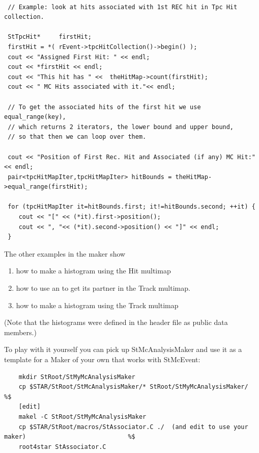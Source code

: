 \begin{verbatim}

 // Example: look at hits associated with 1st REC hit in Tpc Hit collection.

 StTpcHit*     firstHit;
 firstHit = *( rEvent->tpcHitCollection()->begin() );
 cout << "Assigned First Hit: " << endl;
 cout << *firstHit << endl;
 cout << "This hit has " <<  theHitMap->count(firstHit);
 cout << " MC Hits associated with it."<< endl;

 // To get the associated hits of the first hit we use equal_range(key),
 // which returns 2 iterators, the lower bound and upper bound,
 // so that then we can loop over them.
    
 cout << "Position of First Rec. Hit and Associated (if any) MC Hit:" << endl;
 pair<tpcHitMapIter,tpcHitMapIter> hitBounds = theHitMap->equal_range(firstHit);

 for (tpcHitMapIter it=hitBounds.first; it!=hitBounds.second; ++it) {
    cout << "[" << (*it).first->position();
    cout << ", "<< (*it).second->position() << "]" << endl;
 }
\end{verbatim}

The other examples in the maker show
\begin{enumerate}
\item how to make a histogram using the Hit multimap
\item how to use an  to get its partner in the Track multimap.
\item how to make a histogram using the Track multimap
\end{enumerate}

(Note that the histograms were defined in the header file as public data members.)

To play with it yourself you can pick up StMcAnalysisMaker and 
use it as a template for a Maker of your own that works with
StMcEvent:

\begin{verbatim}
    mkdir StRoot/StMyMcAnalysisMaker
    cp $STAR/StRoot/StMcAnalysisMaker/* StRoot/StMyMcAnalysisMaker/                                   %$
    [edit]
    makel -C StRoot/StMyMcAnalysisMaker
    cp $STAR/StRoot/macros/StAssociator.C ./  (and edit to use your maker)                            %$
    root4star StAssociator.C
\end{verbatim}



